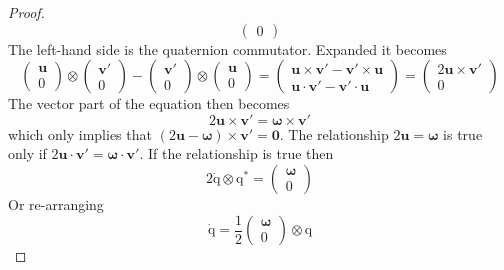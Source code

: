 \documentclass{amsart}
\theoremstyle{definition}
\theoremstyle{remark}
\numberwithin{equation}{section}
\begin{document}
\begin{proof}
\begin{equation}
\begin{pmatrix}
      0
    \end{pmatrix}
  \end{equation}
  The left-hand side is the quaternion commutator. Expanded it becomes
  \begin{equation}
    \begin{pmatrix}
      \mathbf{u} \\
      0
    \end{pmatrix}
    \otimes
    \begin{pmatrix}
      \mathbf{v}'\\
      0
    \end{pmatrix}
    -
    \begin{pmatrix}
      \mathbf{v}'\\
      0
    \end{pmatrix}
    \otimes
    \begin{pmatrix}
      \mathbf{u}\\
      0
    \end{pmatrix}
    =
    \begin{pmatrix}
      \mathbf{u}\times\mathbf{v}'-\mathbf{v}'\times\mathbf{u} \\
      \mathbf{u}\cdot\mathbf{v}'-\mathbf{v}'\cdot\mathbf{u}
    \end{pmatrix}
    =
    \begin{pmatrix}
      2\mathbf{u}\times\mathbf{v}'\\
      0
    \end{pmatrix}
  \end{equation}
  The vector part of the equation then becomes
  \begin{equation}
    2\mathbf{u}\times\mathbf{v}' = \boldsymbol\omega\times\mathbf{v}'
  \end{equation}
  which only implies that $(2\mathbf{u}-\boldsymbol\omega)\times\mathbf{v}' = \mathbf{0}$.
  The relationship $2\mathbf{u}=\boldsymbol\omega$ is true only if $2\mathbf{u}\cdot\mathbf{v}'=\boldsymbol\omega\cdot\mathbf{v}'$.
  If the relationship is true then
  \begin{equation}
    2\mathrm{\dot{q}}\otimes\mathrm{q^*} =
    \begin{pmatrix}
      \boldsymbol\omega \\
      0
    \end{pmatrix}
  \end{equation}
  Or re-arranging
  \begin{equation}
    \mathrm{\dot{q}} = \frac{1}{2}
    \begin{pmatrix}
      \boldsymbol\omega \\
      0
    \end{pmatrix}
    \otimes \mathrm{q}
  \end{equation}
\end{proof}
\end{document}
